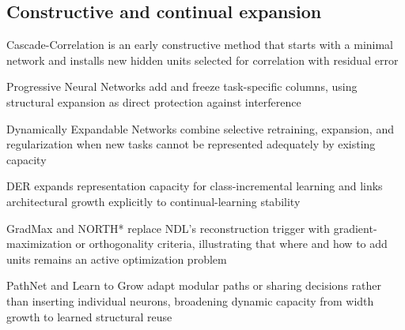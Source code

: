 \subsection{Constructive and continual expansion}
\begin{draftpoints}
  \item Cascade-Correlation is an early constructive method that starts with a minimal network and installs new hidden units selected for correlation with residual error \parencite{fahlman1990cascade}
  \item Progressive Neural Networks add and freeze task-specific columns, using structural expansion as direct protection against interference \parencite{rusu2016progressive}
  \item Dynamically Expandable Networks combine selective retraining, expansion, and regularization when new tasks cannot be represented adequately by existing capacity \parencite{yoon2018den}
  \item DER expands representation capacity for class-incremental learning and links architectural growth explicitly to continual-learning stability \parencite{yan2021der}
  \item GradMax and NORTH* replace NDL's reconstruction trigger with gradient-maximization or orthogonality criteria, illustrating that where and how to add units remains an active optimization problem \parencite{evci2022gradmax,maile2022north}
  \item PathNet and Learn to Grow adapt modular paths or sharing decisions rather than inserting individual neurons, broadening dynamic capacity from width growth to learned structural reuse \parencite{fernando2017pathnet,li2019learn}
\end{draftpoints}

